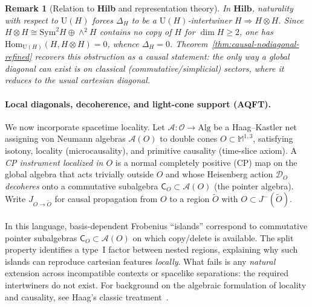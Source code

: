 \documentclass[11pt]{article}
\theoremstyle{upright}
\newtheorem{remark}{Remark}
\begin{document}
\begin{remark}[Relation to \textbf{Hilb} and representation theory]
In $\mathbf{Hilb}$, naturality with respect to $\mathrm{U}(H)$ forces $\Delta_H$ to be a $\mathrm{U}(H)$-intertwiner $H\Rightarrow H\otimes H$. Since $H\otimes H\cong \mathrm{Sym}^2 H\oplus \wedge^2 H$ contains no copy of $H$ for $\dim H\ge 2$, one has $\mathrm{Hom}_{\mathrm{U}(H)}(H,H\otimes H)=0$, whence $\Delta_H=0$. Theorem~\ref{thm:causal-nodiagonal-refined} recovers this obstruction as a \emph{causal} statement: the only way a global diagonal can exist is on classical (commutative/simplicial) sectors, where it reduces to the usual cartesian diagonal.
\end{remark}

\paragraph{Local diagonals, decoherence, and light-cone support (AQFT).}
We now incorporate spacetime locality. Let $\mathcal{A}:\mathcal{O}\to\mathrm{Alg}$ be a Haag--Kastler net assigning von Neumann algebras $\mathcal{A}(O)$ to double cones $O\subset \mathbb{M}^{1,3}$, satisfying isotony, locality (microcausality), and primitive causality (time-slice axiom). A \emph{CP instrument localized in $O$} is a normal completely positive (CP) map on the global algebra that acts trivially outside $O$ and whose Heisenberg action $\mathcal{D}_O$ \emph{decoheres} onto a commutative subalgebra $\mathsf{C}_O\subset \mathcal{A}(O)$ (the pointer algebra). Write $J_{O\to \tilde O}$ for causal propagation from $O$ to a region $\tilde O$ with $O\subset J^-(\tilde O)$.

\paragraph{}
In this language, basis-dependent Frobenius ``islands'' correspond to commutative pointer subalgebras $\mathsf{C}_O\subset\mathcal{A}(O)$ on which copy/delete is available. The split property identifies a type~I factor between nested regions, explaining why such islands can reproduce cartesian features \emph{locally}. What fails is any \emph{natural} extension across incompatible contexts or spacelike separations: the required intertwiners do not exist. For background on the algebraic formulation of locality and causality, see Haag’s classic treatment~\cite{Haag1992}.
\end{document}
